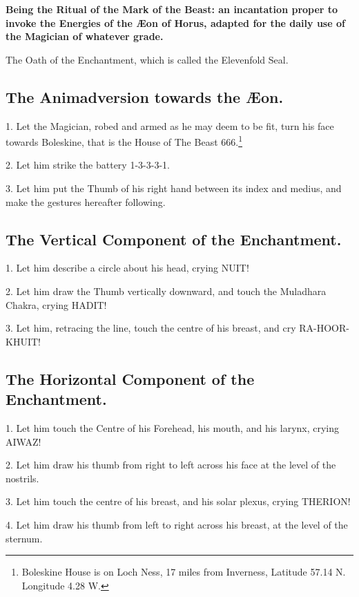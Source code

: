
\textbf{Being the Ritual of the Mark of the Beast: an incantation proper to invoke the Energies of the {\AE}on of Horus, adapted for the daily use of the Magician of whatever grade.}

The Oath of the Enchantment, which is called the Elevenfold Seal.

\subsection*{The Animadversion towards the {\AE}on.}

1. Let the Magician, robed and armed as he may deem to be fit, turn his face towards Boleskine, that is the House of The Beast 666.\footnote{Boleskine House is on Loch Ness, 17 miles from Inverness, Latitude 57.14 N. Longitude 4.28 W.}

2. Let him strike the battery 1-3-3-3-1.

3. Let him put the Thumb of his right hand between its index and medius, and make the gestures hereafter following.

\subsection*{The Vertical Component of the Enchantment.}

1. Let him describe a circle about his head, crying NUIT!

2. Let him draw the Thumb vertically downward, and touch the Muladhara Chakra, crying HADIT!

3. Let him, retracing the line, touch the centre of his breast, and cry RA-HOOR-KHUIT!

\subsection*{The Horizontal Component of the Enchantment.}

1. Let him touch the Centre of his Forehead, his mouth, and his larynx, crying AIWAZ!

2. Let him draw his thumb from right to left across his face at the level of the nostrils.

3. Let him touch the centre of his breast, and his solar plexus, crying THERION!

4. Let him draw his thumb from left to right across his breast, at the level of the sternum.

